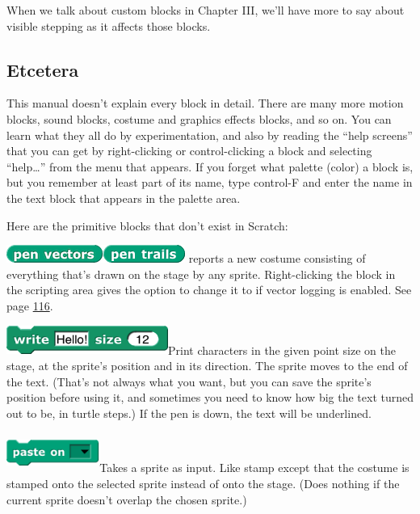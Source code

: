 When we talk about custom blocks in Chapter III, we'll have more to say
about visible stepping as it affects those blocks.

\subsection{Etcetera}\label{etcetera}

This manual doesn't explain every block in detail. There are many more
motion blocks, sound blocks, costume and graphics effects blocks, and so
on. You can learn what they all do by experimentation, and also by
reading the ``help screens'' that you can get by right-clicking or
control-clicking a block and selecting ``help\ldots'' from the menu that
appears. If you forget what palette (color) a block is, but you remember
at least part of its name, type control-F and enter the name in the text
block that appears in the palette area.

Here are the primitive blocks that don't exist in Scratch:

\includegraphics[width=1.25in,height=0.22917in]{media/image135.png}\includegraphics[width=1.05208in,height=0.22917in]{media/image136.png}
reports a new costume consisting of everything that's drawn on the stage
by any sprite. Right-clicking the block in the scripting area gives the
option to change it to if vector logging is enabled. See page
\hyperref[logpenvectors]{116}.

\includegraphics[width=2.08333in,height=0.375in]{media/image137.png}Print
characters in the given point size on the stage, at the sprite's
position and in its direction. The sprite moves to the end of the text.
(That's not always what you want, but you can save the sprite's position
before using it, and sometimes you need to know how big the text turned
out to be, in turtle steps.) If the pen is down, the text will be
underlined.

\includegraphics[width=1.20069in,height=0.51389in]{media/image138.png}Takes
a sprite as input. Like stamp except that the costume is stamped onto
the selected sprite instead of onto the stage. (Does nothing if the
current sprite doesn't overlap the chosen sprite.)

